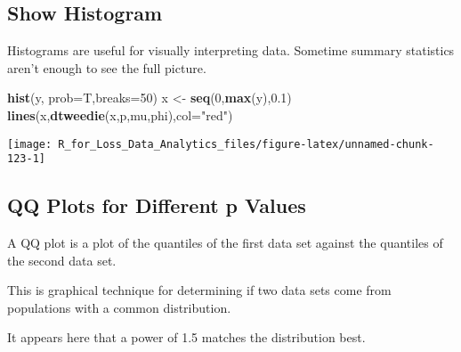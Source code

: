 \documentclass[]{book}
\newenvironment{Shaded}{\begin{snugshade}}{\end{snugshade}}
\newcommand{\KeywordTok}[1]{\textcolor[rgb]{0.13,0.29,0.53}{\textbf{#1}}}
\newcommand{\DataTypeTok}[1]{\textcolor[rgb]{0.13,0.29,0.53}{#1}}
\newcommand{\DecValTok}[1]{\textcolor[rgb]{0.00,0.00,0.81}{#1}}
\newcommand{\FloatTok}[1]{\textcolor[rgb]{0.00,0.00,0.81}{#1}}
\newcommand{\StringTok}[1]{\textcolor[rgb]{0.31,0.60,0.02}{#1}}
\newcommand{\NormalTok}[1]{#1}
\theoremstyle{definition}
\theoremstyle{definition}
\theoremstyle{definition}
\theoremstyle{remark}
\begin{document}
\subsection{Show Histogram}\label{show-histogram}

Histograms are useful for visually interpreting data. Sometime summary
statistics aren't enough to see the full picture.

\begin{Shaded}
\begin{Highlighting}[]
\KeywordTok{hist}\NormalTok{(y, }\DataTypeTok{prob=}\NormalTok{T,}\DataTypeTok{breaks=}\DecValTok{50}\NormalTok{)}
\NormalTok{x <-}\StringTok{ }\KeywordTok{seq}\NormalTok{(}\DecValTok{0}\NormalTok{,}\KeywordTok{max}\NormalTok{(y),}\FloatTok{0.1}\NormalTok{)}
\KeywordTok{lines}\NormalTok{(x,}\KeywordTok{dtweedie}\NormalTok{(x,p,mu,phi),}\DataTypeTok{col=}\StringTok{"red"}\NormalTok{)}
\end{Highlighting}
\end{Shaded}

\begin{center}\texttt{[image: R\_for\_Loss\_Data\_Analytics\_files/figure-latex/unnamed-chunk-123-1]} \end{center}

\subsection{QQ Plots for Different p
Values}\label{qq-plots-for-different-p-values}

A QQ plot is a plot of the quantiles of the first data set against the
quantiles of the second data set.

This is graphical technique for determining if two data sets come from
populations with a common distribution.

It appears here that a power of 1.5 matches the distribution best.
\end{document}
